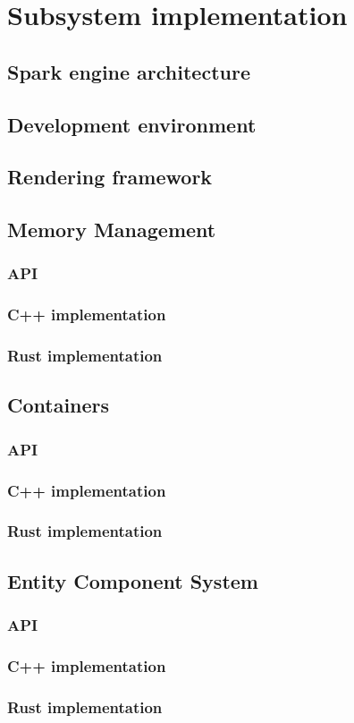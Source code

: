 \chapter{Subsystem implementation}
\blindtext
\section{Spark engine architecture}
\blindtext
\section{Development environment}
\blindtext
\section{Rendering framework}
\blindtext
\section{Memory Management} \label{mem_impl}
\blindtext
\subsection{API}
\blindtext
\subsection{C++ implementation}
\blindtext
\subsection{Rust implementation}
\blindtext
\section{Containers}
\blindtext
\subsection{API}
\blindtext
\subsection{C++ implementation}
\blindtext
\subsection{Rust implementation}
\blindtext
\section{Entity Component System} \label{ecs_impl}
\blindtext
\subsection{API}
\blindtext
\subsection{C++ implementation}
\blindtext
\subsection{Rust implementation}
\blindtext